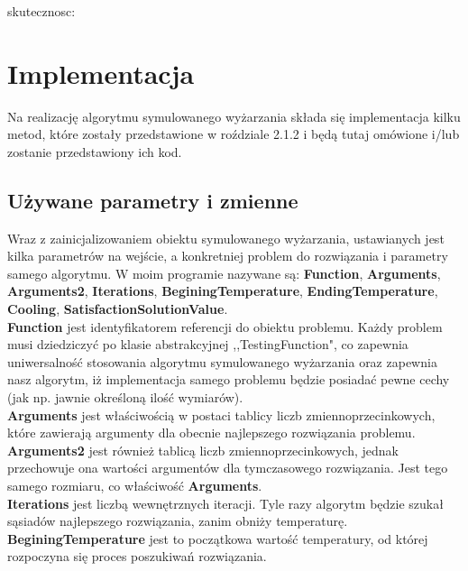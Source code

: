 \documentclass[twoside]{projektInzynierskiMS1}
\newcommand{\si}{ś}
\begin{document}
skutecznosc:\\

\section{Implementacja}

Na realizację algorytmu symulowanego wyżarzania składa się implementacja kilku metod, które zostały przedstawione w roździale 2.1.2 i będą tutaj omówione i/lub zostanie przedstawiony ich kod. \\

\subsection{Używane parametry i zmienne}
Wraz z zainicjalizowaniem obiektu symulowanego wyżarzania, ustawianych jest kilka parametrów na wej\si cie, a konkretniej problem do rozwiązania i parametry samego algorytmu. W moim programie nazywane są: \textbf{Function}, \textbf{Arguments}, \textbf{Arguments2}, \textbf{Iterations}, \textbf{BeginingTemperature}, \textbf{EndingTemperature}, \textbf{Cooling}, \textbf{SatisfactionSolutionValue}. \\

\textbf{Function} jest identyfikatorem referencji do obiektu problemu. Każdy problem musi dziedziczyć po klasie abstrakcyjnej ,,TestingFunction", co zapewnia uniwersalno\si ć stosowania algorytmu symulowanego wyżarzania oraz zapewnia nasz algorytm, iż implementacja samego problemu będzie posiadać pewne cechy (jak np. jawnie okre\si loną ilo\si ć wymiarów). \\

\textbf{Arguments} jest wła\si ciwo\si cią w postaci tablicy liczb zmiennoprzecinkowych, które zawierają argumenty dla obecnie najlepszego rozwiązania problemu. \\

\textbf{Arguments2} jest również tablicą liczb zmiennoprzecinkowych, jednak przechowuje ona warto\si ci argumentów dla tymczasowego rozwiązania. Jest tego samego rozmiaru, co wła\si ciwo\si ć \textbf{Arguments}. \\

\textbf{Iterations} jest liczbą wewnętrznych iteracji. Tyle razy algorytm będzie szukał sąsiadów najlepszego rozwiązania, zanim obniży temperaturę. \\

\textbf{BeginingTemperature} jest to początkowa warto\si ć temperatury, od której rozpoczyna się proces poszukiwań rozwiązania. \\ 
\end{document}
